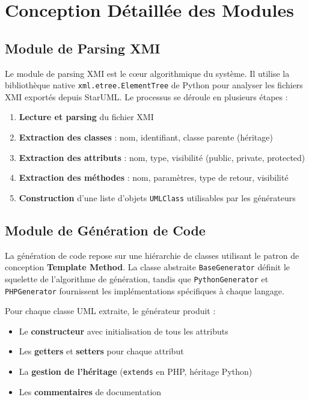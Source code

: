 \section{Conception Détaillée des Modules}

\subsection{Module de Parsing XMI}

Le module de parsing XMI est le cœur algorithmique du système. Il utilise la bibliothèque native \texttt{xml.etree.ElementTree} de Python pour analyser les fichiers XMI exportés depuis StarUML. Le processus se déroule en plusieurs étapes :

\begin{enumerate}
    \item \textbf{Lecture et parsing} du fichier XMI
    \item \textbf{Extraction des classes} : nom, identifiant, classe parente (héritage)
    \item \textbf{Extraction des attributs} : nom, type, visibilité (public, private, protected)
    \item \textbf{Extraction des méthodes} : nom, paramètres, type de retour, visibilité
    \item \textbf{Construction} d'une liste d'objets \texttt{UMLClass} utilisables par les générateurs
\end{enumerate}

\subsection{Module de Génération de Code}

La génération de code repose sur une hiérarchie de classes utilisant le patron de conception \textbf{Template Method}. La classe abstraite \texttt{BaseGenerator} définit le squelette de l'algorithme de génération, tandis que \texttt{PythonGenerator} et \texttt{PHPGenerator} fournissent les implémentations spécifiques à chaque langage.

Pour chaque classe UML extraite, le générateur produit :
\begin{itemize}
    \item Le \textbf{constructeur} avec initialisation de tous les attributs
    \item Les \textbf{getters} et \textbf{setters} pour chaque attribut
    \item La \textbf{gestion de l'héritage} (\texttt{extends} en PHP, héritage Python)
    \item Les \textbf{commentaires} de documentation
\end{itemize}

